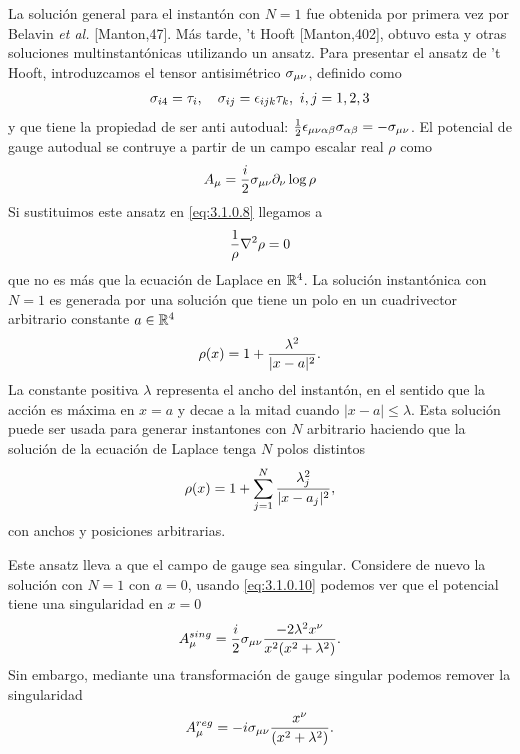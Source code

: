 La solución general para el instantón con $N=1$ fue obtenida por primera vez por Belavin \emph{et al.} [Manton,47]. Más tarde, 't Hooft [Manton,402], obtuvo esta y otras soluciones multinstantónicas utilizando un ansatz. Para presentar el ansatz de 't Hooft, introduzcamos el tensor antisimétrico $\sigma_{\mu\nu}$, definido como
\begin{align}
	\sigma_{i4}=\tau_i, \ \ \ \sigma_{ij}=\epsilon_{ijk}\tau_k, \ i,j=1,2,3 \label{eq:3.1.0.9}
\end{align}
y que tiene la propiedad de ser anti autodual: $\frac{1}{2}\epsilon_{\mu\nu\alpha\beta}\sigma_{\alpha\beta}=-\sigma_{\mu\nu}$. El potencial de gauge autodual se contruye a partir de un campo escalar real $\rho$ como
\begin{align}
	A_\mu = \frac{i}{2}\sigma_{\mu\nu}\partial_\nu\log\rho \label{eq:3.1.0.10}
\end{align}
Si sustituimos este ansatz en \eqref{eq:3.1.0.8} llegamos a 
\begin{align}
	\frac{1}{\rho}\nabla^2\rho=0 \label{eq:3.1.0.11}
\end{align}
que no es más que la ecuación de Laplace en $\mathbb{R}^4$. La solución instantónica con $N=1$ es generada por una solución que tiene un polo en un cuadrivector arbitrario constante $a\in\mathbb{R}^4$
\begin{align}
	\rho(x) = 1+\frac{\lambda^2}{|x-a|^2}. \label{eq:3.1.0.12}
\end{align}
La constante positiva $\lambda$ representa el ancho del instantón, en el sentido que la acción es máxima en $x=a$ y decae a la mitad cuando $|x-a|\leq\lambda$. Esta solución puede ser usada para generar instantones con $N$ arbitrario haciendo que la solución de la ecuación de Laplace tenga $N$ polos distintos
\begin{align}
	\rho(x) = 1+\sum_{j=1}^N\frac{\lambda_j^2}{|x-a_j|^2},
\end{align}
con anchos y posiciones arbitrarias.

Este ansatz lleva a que el campo de gauge sea singular. Considere de nuevo la solución con $N=1$ con $a=0$, usando \eqref{eq:3.1.0.10} podemos ver que el potencial tiene una singularidad en $x=0$
\begin{align}
	A_\mu^{sing} = \frac{i}{2}\sigma_{\mu\nu}\frac{-2\lambda^2x^\nu}{x^2(x^2+\lambda^2)}. \label{eq:3.1.0.13}
\end{align}
Sin embargo, mediante una transformación de gauge singular podemos remover la singularidad
\begin{align}
	A_\mu^{reg} = -i\sigma_{\mu\nu}\frac{x^\nu}{(x^2+\lambda^2)}. \label{eq:3.1.0.14}
\end{align}

